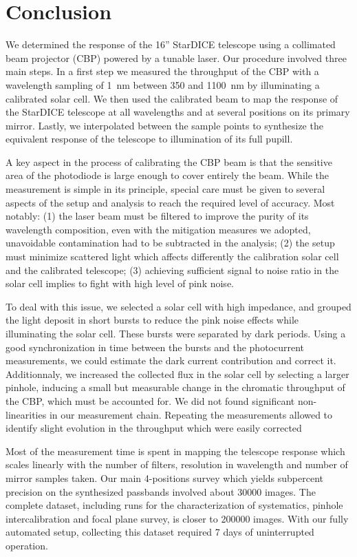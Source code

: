 \section{Conclusion}
\label{sec:discussion}

We determined the response of the 16'' StarDICE telescope using a
collimated beam projector (CBP) powered by a tunable laser. Our
procedure involved three main steps. In a first step we measured the
throughput of the CBP with a wavelength sampling of \SI{1}{nm} between
350 and \SI{1100}{nm} by illuminating a calibrated solar cell. We then
used the calibrated beam to map the response of the StarDICE telescope
at all wavelengths and at several positions on its primary
mirror. Lastly, we interpolated between the sample points to
synthesize the equivalent response of the telescope to illumination
of its full pupill.

A key aspect in the process of calibrating the CBP beam is that the
sensitive area of the photodiode is large enough to cover entirely the
beam. While the measurement is simple in its principle, special
care must be given to several aspects of the setup and analysis to
reach the required level of accuracy. Most notably: (1) the laser beam must be filtered to improve the purity of its wavelength
composition, even with the mitigation measures we adopted, unavoidable
contamination had to be subtracted in the analysis; (2) the setup must minimize scattered light which affects differently the calibration solar cell and the calibrated telescope; (3) achieving sufficient signal to noise ratio in the solar cell implies to fight with high level of pink noise.

To deal with this issue, we selected a solar cell with high
impedance, and grouped the light deposit in short bursts to reduce the
pink noise effects while illuminating the solar cell.
These bursts were separated by dark periods. Using a good synchronization in time
between the bursts and the photocurrent measurements, 
we could estimate the dark current contribution and correct it.
Additionnaly, we increased the collected flux in the solar cell 
by selecting a larger pinhole, inducing a small but measurable change in the
chromatic throughput of the CBP, which must be accounted for.
We did not found significant non-linearities in our measurement
chain. Repeating the measurements allowed to identify slight
evolution in the throughput which were easily corrected

Most of the measurement time is spent in mapping the telescope
response which scales linearly with the number of filters,
resolution in wavelength and number of mirror samples taken. Our main
4-positions survey which yields subpercent precision on the
synthesized passbands involved about 30000 images. The complete
dataset, including runs for the characterization of systematics,
pinhole intercalibration and focal plane survey, is closer to 200000
images. With our fully automated setup, collecting this dataset required
7 days of uninterrupted operation. 

